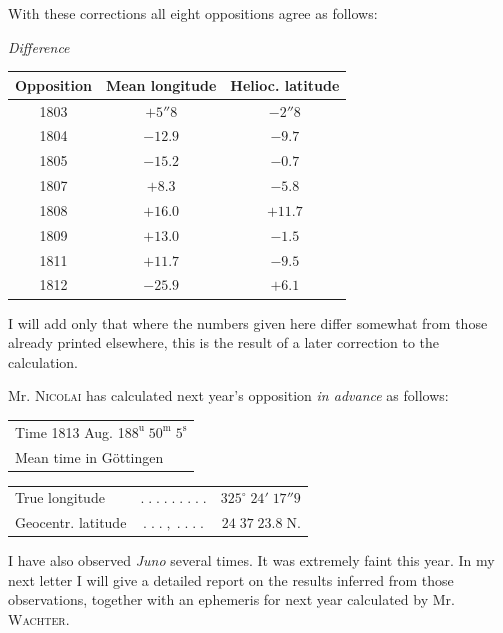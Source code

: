 \noindent With these corrections all eight oppositions agree as follows:

\begin{center}
\emph{Difference}
\end{center}

\begin{center}
\fontsize{10}{12}\selectfont\setlength{\tabcolsep}{6pt}\renewcommand{\arraystretch}{1.15}\begin{tabular}{c|c|c}
Opposition & Mean longitude & Helioc. latitude \\
\hline
1803 & $+5''8$ & $-2''8$ \\
1804 & $-12.9$ & $-9.7$ \\
1805 & $-15.2$ & $-0.7$ \\
1807 & $+8.3$ & $-5.8$ \\
1808 & $+16.0$ & $+11.7$ \\
1809 & $+13.0$ & $-1.5$ \\
1811 & $+11.7$ & $-9.5$ \\
1812 & $-25.9$ & $+6.1$ \\
\end{tabular}
\end{center}

\par\indent I will add only that where the numbers given here differ somewhat from those already printed elsewhere, this is the result of a later correction to the calculation.

\par\indent Mr. \textsc{Nicolai} has calculated next year’s opposition \emph{in advance} as follows:
\begin{center}\fontsize{10}{12}\selectfont\setlength{\tabcolsep}{0pt}\renewcommand{\arraystretch}{1.15}\begin{tabular}{l}
Time 1813 Aug. 18\quad $8^{\mathrm u}\;50^{\mathrm m}\;5^{\mathrm s}$\\Mean time in Göttingen
\end{tabular}\end{center}
\begin{center}\fontsize{10}{12}\selectfont\setlength{\tabcolsep}{2pt}\renewcommand{\arraystretch}{1.15}\begin{tabular}{lcr}
True longitude & $.\;.\;.\;.\;.\;.\;.\;.\;.$ & $325^\circ\;24'\;17''9$\\
Geocentr. latitude & $.\;.\;.\;,\;.\;.\;.\;.$ & $24\;37\;23.8\;\mathrm{N}.$\\
\end{tabular}\end{center}

\par\indent I have also observed \emph{Juno} several times. It was extremely faint this year. In my next letter I will give a detailed report on the results inferred from those observations, together with an ephemeris for next year calculated by Mr. \textsc{Wachter}.
